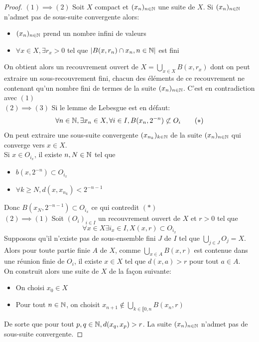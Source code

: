 \documentclass[]{report}
\begin{document}
    \begin{proof}
        $(1)\implies (2)$ Soit $X$ compact et $(x_n)_{n\in\mathbb{N}}$ une suite de $X$. Si $(x_n)_{n\in\mathbb{N}}$ n'admet pas de sous-suite convergente alors:
        \begin{itemize}
            \item $(x_n)_{n\in\mathbb{N}}$ prend un nombre infini de valeurs
            \item $\forall x\in X,\exists r_x>0$ tel que $|B(x,r_n)\cap{x_n,{n\in\mathbb{N}}}|$ est fini
        \end{itemize}
        On obtient alors un recouvrement ouvert de $X=\bigcup_{x\in X} B(x,r_x)$ dont on peut extraire un sous-recouvrement fini, chacun des éléments de ce recouvrement ne contenant qu'un nombre fini de termes de la suite $(x_n)_{n\in\mathbb{N}}$. C'est en contradiction avec $(1)$\\
        $(2)\implies (3)$ Si le lemme de Lebesgue est en défaut:
        \[\forall n\in \mathbb{N},\exists x_n\in X,\forall i\in I,B(x_n,2^{-n})\not\subset O_i\qquad (*)\]
        On peut extraire une sous-suite convergente $(x_{n_k})_{k\in \mathbb{N}}$ de la suite $(x_n)_{n\in\mathbb{N}}$ qui converge vers $x\in X$.\\
        Si $x\in O_{i_x}$, il existe $n,N\in \mathbb{N}$ tel que
        \begin{itemize}
            \item $b(x,2^{-n})\subset O_{i_x}$
            \item $\forall k\ge N,d(x,x_{n_k})< 2^{-n-1}$
        \end{itemize}
        Donc $B(x_N,2^{-n-1})\subset O_{i_x}$ ce qui contredit $(*)$\\
        $(2)\implies (1)$ Soit $(O_i)_{i\in I}$ un recouvrement ouvert de $X$ et $r>0$ tel que
        \[\forall x\in X\exists i_x\in I,X(x,r)\subset O_{i_x}\]
        Supposons qu'il n'existe pas de sous-ensemble fini $J$ de $I$ tel que $\bigcup_{j\in J}O_j=X$. Alors pour toute partie finie $A$ de $X$, comme $\bigcup_{x\in A}B(x,r)$ est contenue dans une réunion finie de $O_i$, il existe $x\in X$ tel que $d(x,a)>r$ pour tout $a\in A$.\\
        On construit alors une suite de $X$ de la façon suivante:
        \begin{itemize}
            \item On choisi $x_0\in X$
            \item Pour tout $n\in\mathbb{N}$, on choisit $x_{n+1}\notin \bigcup_{k\in\llbracket 0,n}B(x_n,r)$
        \end{itemize}
        De sorte que pour tout $p,q\in \mathbb{N},d(x_q,x_p)>r$. La suite $(x_n)_{n\in\mathbb{N}}$ n'admet pas de sous-suite convergente.
    \end{proof}
\end{document}
